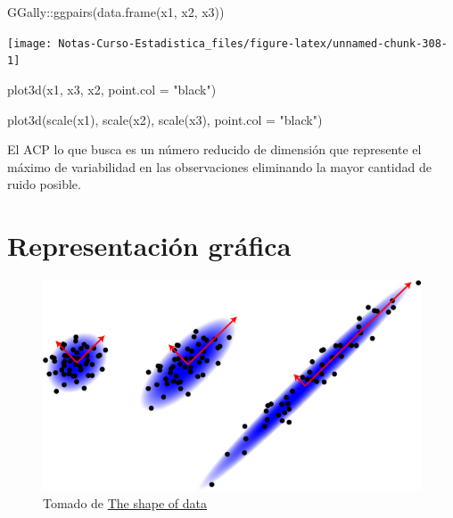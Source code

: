 \documentclass[
  12pt,
]{book}
\newenvironment{Shaded}{\begin{snugshade}}{\end{snugshade}}
\newcommand{\AttributeTok}[1]{\textcolor[rgb]{0.77,0.63,0.00}{#1}}
\newcommand{\FunctionTok}[1]{\textcolor[rgb]{0.00,0.00,0.00}{#1}}
\newcommand{\NormalTok}[1]{#1}
\newcommand{\SpecialCharTok}[1]{\textcolor[rgb]{0.00,0.00,0.00}{#1}}
\newcommand{\StringTok}[1]{\textcolor[rgb]{0.31,0.60,0.02}{#1}}
\theoremstyle{definition}
\theoremstyle{definition}
\theoremstyle{definition}
\theoremstyle{remark}
\begin{document}
\begin{Shaded}
\begin{Highlighting}[]
\NormalTok{GGally}\SpecialCharTok{::}\FunctionTok{ggpairs}\NormalTok{(}\FunctionTok{data.frame}\NormalTok{(x1, x2, x3))}
\end{Highlighting}
\end{Shaded}

\begin{center}\texttt{[image: Notas-Curso-Estadistica\_files/figure-latex/unnamed-chunk-308-1]} \end{center}

\begin{Shaded}
\begin{Highlighting}[]
\FunctionTok{plot3d}\NormalTok{(x1, x3, x2, }\AttributeTok{point.col =} \StringTok{"black"}\NormalTok{)}

\FunctionTok{plot3d}\NormalTok{(}\FunctionTok{scale}\NormalTok{(x1), }\FunctionTok{scale}\NormalTok{(x2), }\FunctionTok{scale}\NormalTok{(x3), }\AttributeTok{point.col =} \StringTok{"black"}\NormalTok{)}
\end{Highlighting}
\end{Shaded}

El ACP lo que busca es un número reducido de dimensión que represente el máximo de variabilidad en las observaciones eliminando la mayor cantidad de ruido posible.

\hypertarget{representaciuxf3n-gruxe1fica}{%
\section{Representación gráfica}\label{representaciuxf3n-gruxe1fica}}

\begin{figure}
\centering
\includegraphics{manual_figures/pca.png}
\caption{Tomado de \href{https://shapeofdata.wordpress.com/2013/04/09/principle-component-analysis/}{The shape of data}}
\end{figure}
\end{document}
